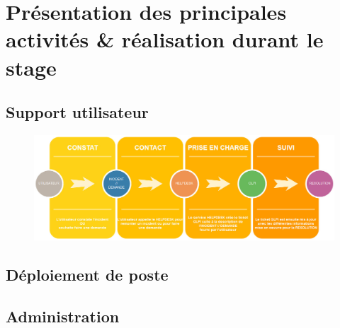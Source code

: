 \documentclass[11pt,a4paper,oneside]{article}
\begin{document}
\section{Présentation des principales activités \& réalisation durant le stage}
\subsection{Support utilisateur}

\begin{figure}[!h]
\centering
\includegraphics[scale=0.42]{Ressources/GLPI.jpg}
\caption{\label{Schéma de support}}
\end{figure}
\newpage

\subsection{Déploiement de poste}
\newpage

\subsection{Administration}
\newpage
\end{document}
